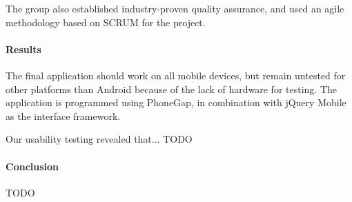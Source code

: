 The group also established industry-proven quality assurance, and used an agile
methodology based on SCRUM for the project. 

\paragraph{Results}
The final application should work on all mobile devices, but remain untested for
other platforms than Android because of the lack of hardware for testing. The
application is programmed using PhoneGap, in combination with jQuery Mobile as the
interface framework.

Our usability testing revealed that... TODO

\paragraph{Conclusion}
TODO


